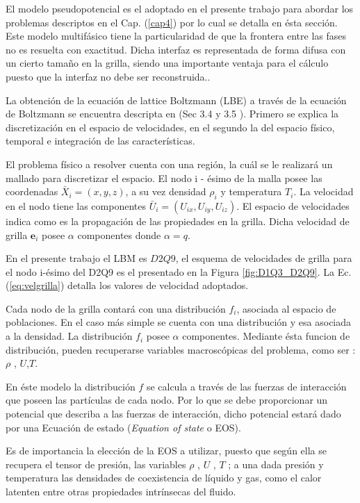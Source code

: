 El modelo pseudopotencial es el adoptado en el presente trabajo para abordar los problemas descriptos en el Cap. (\ref{cap4}) por lo cual se detalla en ésta sección. Este modelo multifásico tiene la particularidad de que la frontera entre las fases no es resuelta con exactitud. Dicha interfaz es representada de forma difusa con un cierto tamaño en la grilla, siendo una importante ventaja para el cálculo puesto que la interfaz no debe ser reconstruida.\cite{parrill2019reviews}.


La obtención de la ecuación de lattice Boltzmann (LBE) a través de la ecuación de Boltzmann se encuentra descripta en \cite{kruger2017lattice} (Sec 3.4 y 3.5 ). Primero se explica la discretización en el espacio de velocidades, en el segundo la del espacio físico, temporal e integración de las características.


El problema físico a resolver cuenta con una región, la cuál se le realizará un mallado para discretizar el espacio. El nodo i - ésimo de la malla posee las coordenadas ${\bar{X}}_{i} = (x,y,z)$, a su vez densidad $\rho_{i}$ y temperatura $T_{i}$. La velocidad en el nodo tiene las componentes ${\bar{U}}_{i} = ({U}_{ix},{U}_{iy},{U}_{iz})$. El espacio de velocidades indica como es la propagación de las propiedades en la grilla. Dicha velocidad de grilla $\mathbf{e}_{i}$ posee $\alpha$ componentes donde $\alpha = q $. 

En el presente trabajo el LBM es $D2Q9$, el esquema de velocidades de grilla para el nodo i-ésimo del D2Q9 es el presentado en la Figura \ref{fig:D1Q3_D2Q9}. La Ec. (\ref{eq:velgrilla}) detalla los valores de velocidad adoptados. 

Cada nodo de la grilla contará con una distribución $f_{i}$, asociada al espacio de poblaciones. En el caso más simple se cuenta con una distribución y esa asociada a la densidad. La distribución $f_{i}$ posee $\alpha$ componentes. Mediante ésta funcion de distribución, pueden recuperarse variables macroscópicas del problema, como ser : $\rho$ , $U$,$T$.

En éste modelo la distribución $f$ se calcula a través de las fuerzas de interacción que poseen las partículas de cada nodo. Por lo que se debe proporcionar un potencial que describa a las fuerzas de interacción, dicho potencial estará dado por una Ecuación de estado (\textit{Equation of state} o EOS).

Es de importancia la elección de la EOS a utilizar, puesto que según ella se recupera el tensor de presión, las variables $\rho$ , $U$ , $T$ ; a una dada presión y temperatura las densidades de coexistencia de líquido y gas, como el calor latenten entre otras propiedades intrínsecas del fluido.

